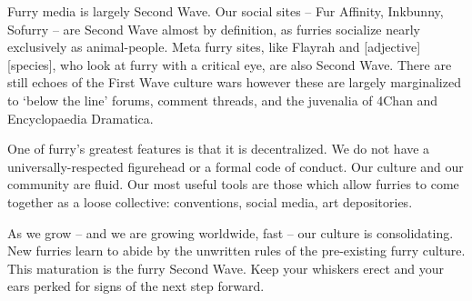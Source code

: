 Furry media is largely Second Wave. Our social sites -- Fur Affinity, Inkbunny, Sofurry -- are Second Wave almost by definition, as furries socialize nearly exclusively as animal-people. Meta furry sites, like Flayrah and [adjective][species], who look at furry with a critical eye, are also Second Wave. There are still echoes of the First Wave culture wars however these are largely marginalized to `below the line' forums, comment threads, and the juvenalia of 4Chan and Encyclopaedia Dramatica.

One of furry's greatest features is that it is decentralized. We do not have a universally-respected figurehead or a formal code of conduct. Our culture and our community are fluid. Our most useful tools are those which allow furries to come together as a loose collective: conventions, social media, art depositories.

As we grow -- and we are growing worldwide, fast -- our culture is consolidating. New furries learn to abide by the unwritten rules of the pre-existing furry culture. This maturation is the furry Second Wave. Keep your whiskers erect and your ears perked for signs of the next step forward.
